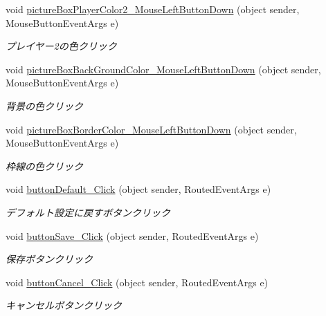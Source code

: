 \begin{DoxyCompactItemize}
void \hyperlink{class_reversi_wpf_1_1_setting_window_ac65d56e2734421d049aad8708c0d3635}{picture\+Box\+Player\+Color2\+\_\+\+Mouse\+Left\+Button\+Down} (object sender, Mouse\+Button\+Event\+Args e)
\begin{DoxyCompactList}\small\item\em プレイヤー2の色クリック \end{DoxyCompactList}\item 
void \hyperlink{class_reversi_wpf_1_1_setting_window_ae83eafa4fc29e4891285bef8b7f5910c}{picture\+Box\+Back\+Ground\+Color\+\_\+\+Mouse\+Left\+Button\+Down} (object sender, Mouse\+Button\+Event\+Args e)
\begin{DoxyCompactList}\small\item\em 背景の色クリック \end{DoxyCompactList}\item 
void \hyperlink{class_reversi_wpf_1_1_setting_window_aacfa614e5d3f247b881ab573da2f1558}{picture\+Box\+Border\+Color\+\_\+\+Mouse\+Left\+Button\+Down} (object sender, Mouse\+Button\+Event\+Args e)
\begin{DoxyCompactList}\small\item\em 枠線の色クリック \end{DoxyCompactList}\item 
void \hyperlink{class_reversi_wpf_1_1_setting_window_a89915c749b20f8bbc1f2ee856e782308}{button\+Default\+\_\+\+Click} (object sender, Routed\+Event\+Args e)
\begin{DoxyCompactList}\small\item\em デフォルト設定に戻すボタンクリック \end{DoxyCompactList}\item 
void \hyperlink{class_reversi_wpf_1_1_setting_window_a0d317cbd756238e27d71d72923fad39c}{button\+Save\+\_\+\+Click} (object sender, Routed\+Event\+Args e)
\begin{DoxyCompactList}\small\item\em 保存ボタンクリック \end{DoxyCompactList}\item 
void \hyperlink{class_reversi_wpf_1_1_setting_window_aacca71ce9e594912ca597fe41f5e6466}{button\+Cancel\+\_\+\+Click} (object sender, Routed\+Event\+Args e)
\begin{DoxyCompactList}\small\item\em キャンセルボタンクリック \end{DoxyCompactList}\end{DoxyCompactItemize}
